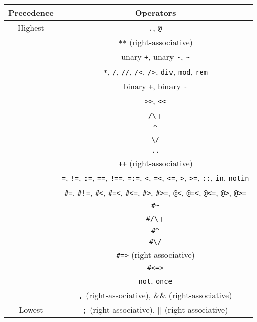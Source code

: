 \begin{center}
\begin{tabular}{ |c|c| } \hline
Precedence & Operators  \\ \hline \hline
Highest    & \verb+.+, \verb+@+ \\ \hline
           & \verb+**+ (right-associative) \\ \hline
           & unary \verb-+-, unary \verb+-+, \verb+~+  \\ \hline 
           & \verb+*+, \verb+/+, \verb+//+, \verb+/<+, \verb+/>+, \verb+div+, \verb+mod+, \verb+rem+ \\ \hline 
           & binary \verb-+-, binary \verb+-+ \\ \hline 
           & \verb+>>+, \verb+<<+ \\ \hline 
           & \verb+/\+ \\ \hline 
           & \verb+^+ \\ \hline 
           & \verb+\/+ \\ \hline 
           & \verb+..+ \\ \hline 
           & \verb-++- (right-associative) \\ \hline 
           &  \verb+=+, \verb+!=+,  \verb+:=+,  \verb+==+, \verb+!==+, \verb+=:=+, \verb+<+,  \verb+=<+, \verb+<=+, \verb+>+,  \verb+>=+, \verb+::+, \verb+in+, \verb+notin+  \\ 
           &  \verb+#=+,  \verb+#!=+, \verb+#<+,  \verb+#=<+, \verb+#<=+, \verb+#>+, \verb+#>=+, \verb+@<+, \verb+@=<+, \verb+@<=+, \verb+@>+, \verb+@>=+  \\ \hline 
           & \verb+#~+ \\ \hline 
           & \verb+#/\+ \\ \hline 
           & \verb+#^+ \\ \hline 
           & \verb+#\/+ \\ \hline 
           & \verb+#=>+ (right-associative)\\ \hline 
           & \verb+#<=>+ \\ \hline 
           & \verb+not+, \verb+once+  \\ \hline 
           & \verb+,+ (right-associative), $\&\&$ (right-associative) \\ \hline 
Lowest     & \verb+;+ (right-associative), $|$$|$ (right-associative) \\ \hline 
\end{tabular}
\end{center}

